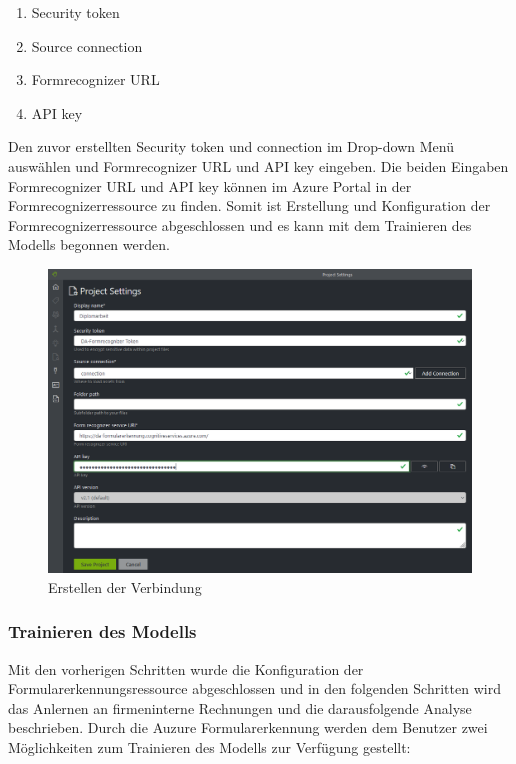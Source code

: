 \begin{enumerate}
    \item Security token
    \item Source connection
    \item Formrecognizer URL
    \item API key
\end{enumerate}

Den zuvor erstellten Security token und connection im Drop-down Menü auswählen und Formrecognizer URL und API key eingeben.
Die beiden Eingaben Formrecognizer URL und API key können im Azure Portal in der Formrecognizerressource  zu finden. Somit ist 
Erstellung und Konfiguration der Formrecognizerressource abgeschlossen und es kann mit dem Trainieren des Modells begonnen werden.

\begin{figure}[h]
    \centering
    \includegraphics[scale=0.5]{sections/cloud-computing/images/formrecognizer-new-project.PNG}
    \caption{Erstellen der Verbindung}
    \label{fig:formrecognizer-security-token}
\end{figure}

\subsubsection{Trainieren des Modells}
Mit den vorherigen Schritten wurde die Konfiguration der Formularerkennungsressource abgeschlossen und in den folgenden Schritten wird das 
Anlernen an firmeninterne Rechnungen und die darausfolgende Analyse beschrieben.
Durch die Auzure Formularerkennung werden dem Benutzer zwei Möglichkeiten zum Trainieren des Modells zur Verfügung gestellt:

